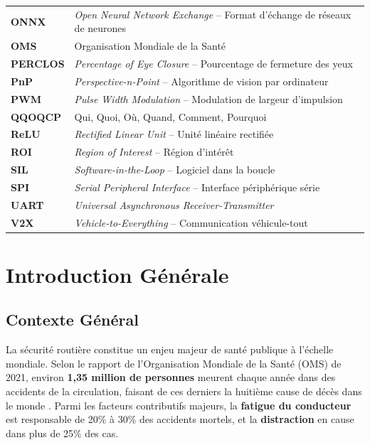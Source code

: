 \documentclass[12pt,a4paper,twoside]{report}
\newcommand{\keyword}[1]{\textbf{\textcolor{stellantisblue}{#1}}}
\begin{document}
\begin{longtable}{@{} >{\bfseries}l @{\hspace{2cm}} l @{}}
ONNX    & \textit{Open Neural Network Exchange} -- Format d'échange de réseaux de neurones \\[0.2cm]
OMS     & Organisation Mondiale de la Santé \\[0.2cm]
PERCLOS & \textit{Percentage of Eye Closure} -- Pourcentage de fermeture des yeux \\[0.2cm]
PnP     & \textit{Perspective-n-Point} -- Algorithme de vision par ordinateur \\[0.2cm]
PWM     & \textit{Pulse Width Modulation} -- Modulation de largeur d'impulsion \\[0.2cm]
QQOQCP  & Qui, Quoi, Où, Quand, Comment, Pourquoi \\[0.2cm]
ReLU    & \textit{Rectified Linear Unit} -- Unité linéaire rectifiée \\[0.2cm]
ROI     & \textit{Region of Interest} -- Région d'intérêt \\[0.2cm]
SIL     & \textit{Software-in-the-Loop} -- Logiciel dans la boucle \\[0.2cm]
SPI     & \textit{Serial Peripheral Interface} -- Interface périphérique série \\[0.2cm]
UART    & \textit{Universal Asynchronous Receiver-Transmitter} \\[0.2cm]
V2X     & \textit{Vehicle-to-Everything} -- Communication véhicule-tout \\[0.2cm]
\end{longtable}




\chapter{Introduction Générale}

\section{Contexte Général}

La sécurité routière constitue un enjeu majeur de santé publique à l'échelle mondiale. Selon le rapport de l'Organisation Mondiale de la Santé (OMS) de 2021, environ \textbf{1,35 million de personnes} meurent chaque année dans des accidents de la circulation, faisant de ces derniers la huitième cause de décès dans le monde \cite{oms2021}. Parmi les facteurs contributifs majeurs, la \keyword{fatigue du conducteur} est responsable de 20\% à 30\% des accidents mortels, et la \keyword{distraction} en cause dans plus de 25\% des cas.
\end{document}
